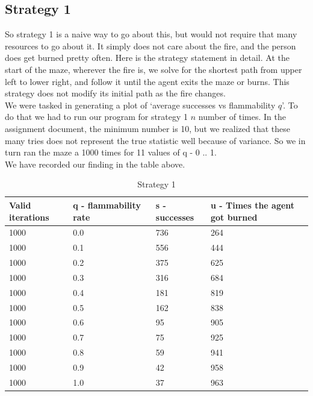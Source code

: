 \documentclass[11pt]{scrartcl} %
\begin{document}

\subsection{Strategy 1}
So strategy 1 is a naive way to go about this, but would not require that many resources to go about it. It simply does not care about the fire, and the person does get burned pretty often. Here is the strategy statement in detail. At the start of the maze, wherever the fire is, we solve for the shortest path from upper left to lower right, and follow  it  until the  agent  exits  the  maze  or  burns.   This  strategy  does  not  modify  its  initial  path  as  the  fire changes.
\vspace{2em}\\
We were tasked in generating a plot of ‘average successes vs flammability $q$’. To do that we had to run our program for strategy 1 $n$ number of times. In the assignment document, the minimum number is 10, but we realized that these many tries does not represent the true statistic well because of variance. So we in turn ran the maze a 1000 times for 11 values of q - 0 .. 1. \\
We have recorded our finding in the table above.\\
\begin{table}[!htb]
\caption{Strategy 1}
\begin{tabular}{|l|l|l|l|}
\hline
\textbf{Valid iterations} & \textbf{q - flammability rate} & \textbf{s - successes} & \textbf{u - Times the agent got burned} \\ \hline
1000 & 0.0   & 736 & 264 \\ \hline
1000 & 0.1 & 556 & 444 \\ \hline
1000 & 0.2 & 375 & 625 \\ \hline
1000 & 0.3 & 316 & 684 \\ \hline
1000 & 0.4 & 181 & 819 \\ \hline
1000 & 0.5 & 162 & 838 \\ \hline
1000 & 0.6 & 95  & 905 \\ \hline
1000 & 0.7 & 75  & 925 \\ \hline
1000 & 0.8 & 59  & 941 \\ \hline
1000 & 0.9 & 42  & 958 \\ \hline
1000 & 1.0   & 37  & 963 \\ \hline
\end{tabular}
\end{table}
\end{document}
